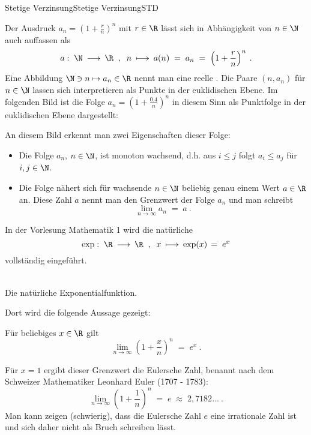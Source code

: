 \begin{MXContent}{Stetige Verzinsung}{Stetige Verzinsung}{STD}

Der Ausdruck $a_{n}=\left({1+\frac{r}{n}}\right)^{n}$ mit $r\in\R$ lässt sich in Abhängigkeit von $n\in\N$ auch auffassen als 
$$
a:\; \N\:\longrightarrow\: \R\;\; , \;\;  n\:\longmapsto\: a(n)\; =\; a_{n}\; =\;\left({ 1+\frac{r}{n}}\right)^{n}\: .
$$
Eine Abbildung $\N \ni n \mapsto a_{n}\in \R$ nennt man eine reelle .
Die Paare $(n,a_{n})$ für $n\in\N$ lassen sich interpretieren als Punkte in der euklidischen Ebene. Im folgenden Bild ist die Folge
$a_{n}=\left({1+\frac{0.4}{n}} \right)^{n}$ in diesem Sinn als Punktfolge in der euklidischen Ebene dargestellt:

\begin{center}
\end{center}

An diesem Bild erkennt man zwei Eigenschaften dieser Folge:
\begin{itemize}
\item{Die Folge $a_{n}$, $n\in \N$, ist monoton wachsend, d.h. aus $i\leq j$ folgt $a_i\leq a_j$ für $i,j\in \N$.}
\item{Die Folge nähert sich für wachsende $n\in \N$ beliebig genau einem Wert $a\in \R$ an. Diese Zahl $a$ nennt man den Grenzwert der Folge $a_{n}$ und man schreibt
$$
\lim\limits_{n\rightarrow \infty} a_{n}\; =\;a\: .
$$}
\end{itemize}
In der Vorlesung Mathematik 1 wird die natürliche 
$$
\exp:\;\R\:\longrightarrow\: \R\;\; , \;\; x\:\longmapsto\: \exp(x)\,=\; e^x
$$
vollständig eingeführt.

\begin{center}
\\
Die natürliche Exponentialfunktion.
\end{center}

Dort wird die folgende Aussage gezeigt:

\begin{MInfo}
Für beliebiges $x\in \R$ gilt
$$
\lim\limits_{n\rightarrow \infty}\left({1 + \frac{x}{n}} \right)^{n}\; =\; e^{x}\: .
$$
\end{MInfo}

Für $x=1$ ergibt dieser Grenzwert die Eulersche Zahl, benannt nach dem Schweizer Mathematiker Leonhard Euler (1707 - 1783):
$$
\lim\limits_{n\rightarrow \infty}\left({1 + \frac{1}{n}} \right)^{n}\; =\; e\;  \approx \; 2,7182\ldots \: .
$$
Man kann zeigen (schwierig), dass die Eulersche Zahl $e$ eine irrationale Zahl ist und sich daher nicht als Bruch schreiben lässt.


\end{MXContent}
